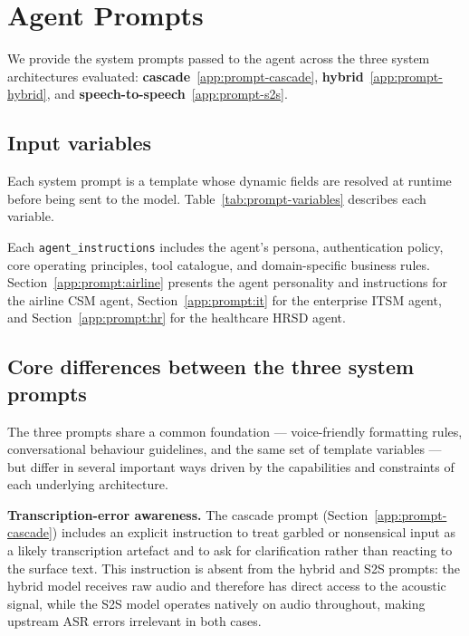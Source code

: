 \clearpage
\section{Agent Prompts}
\label{app:agent_prompts}

We provide the system prompts passed to the agent across the three system architectures evaluated: \textbf{cascade}~\ref{app:prompt-cascade}, \textbf{hybrid}~\ref{app:prompt-hybrid}, and \textbf{speech-to-speech}~\ref{app:prompt-s2s}.

\subsection*{Input variables}

Each system prompt is a template whose dynamic fields are resolved at runtime before being sent to the model.
Table~\ref{tab:prompt-variables} describes each variable.



Each \texttt{agent\_instructions} includes the agent's persona, authentication policy, core operating principles, tool catalogue, and domain-specific business rules.
Section~\ref{app:prompt:airline} presents the agent personality and instructions for the airline CSM agent, Section~\ref{app:prompt:it} for the enterprise ITSM agent, and Section~\ref{app:prompt:hr} for the healthcare HRSD agent.

\subsection*{Core differences between the three system prompts}

The three prompts share a common foundation — voice-friendly formatting rules, conversational behaviour guidelines, and the same set of template variables — but differ in several important ways driven by the capabilities and constraints of each underlying architecture.

\textbf{Transcription-error awareness.}
The cascade prompt (Section~\ref{app:prompt-cascade}) includes an explicit instruction to treat garbled or nonsensical input as a likely transcription artefact and to ask for clarification rather than reacting to the surface text.
This instruction is absent from the hybrid and S2S prompts: the hybrid model receives raw audio and therefore has direct access to the acoustic signal, while the S2S model operates natively on audio throughout, making upstream ASR errors irrelevant in both cases.

